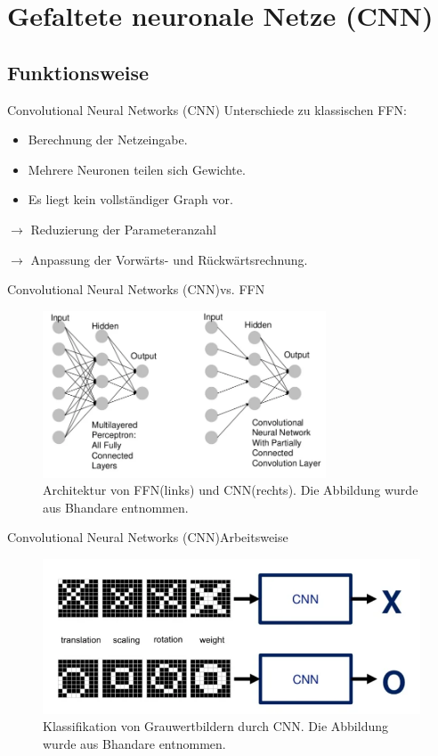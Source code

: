\documentclass[10pt]{beamer} %
\begin{document}
\section{Gefaltete neuronale Netze (CNN)}
\subsection{Funktionsweise}
\begin{frame}{Convolutional Neural Networks (CNN)}
Unterschiede zu klassischen FFN:
\pause
\begin{itemize}
   \item Berechnung der Netzeingabe.
   \pause 
   \item Mehrere Neuronen teilen sich Gewichte.
   \pause
   \item Es liegt kein vollständiger Graph vor.
\end{itemize}
\pause
$\rightarrow$ Reduzierung der Parameteranzahl

$\rightarrow$ Anpassung der Vorwärts- und Rückwärtsrechnung. 

\end{frame}

\begin{frame}{Convolutional Neural Networks (CNN)}{vs. FFN}
   \begin{figure}
      \includegraphics[width=0.75\textwidth]{pics/FFN_vs_CNN.png}
      \caption[]{Architektur von FFN(links) und CNN(rechts). Die Abbildung wurde aus Bhandare\cite{bhandare} entnommen.}
   \end{figure}
\end{frame}

\begin{frame}{Convolutional Neural Networks (CNN)}{Arbeitsweise}
   \begin{figure}
      \includegraphics[width=1\textwidth]{pics/arbeitsweise.png}
      \caption{Klassifikation von Grauwertbildern durch CNN. Die Abbildung wurde aus Bhandare\cite{bhandare} entnommen.}
   \end{figure}
\end{frame}
\end{document}
